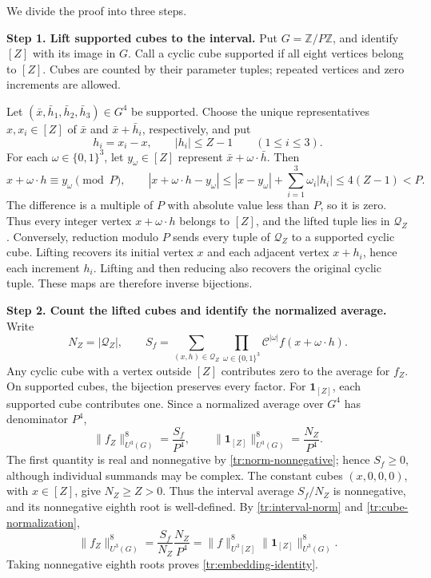 \documentclass[twoside]{aomart}
\makeatletter
\theoremstyle{paperplain}
\theoremstyle{paperdefinition}
\renewenvironment{proof}[1][\proofname]{\par\pushQED{\qed}%
  \normalfont\topsep6\p@\@plus3\p@\relax\trivlist
  \item[\hskip\labelsep\itshape #1\@addpunct{.}]\ignorespaces
}{\popQED\endtrivlist\@endpefalse}
\newcommand{\Z}{\mathbb Z}
\numberwithin{equation}{section}
\makeatother
\begin{document}
\begin{proof}
We divide the proof into three steps.

\medskip
\noindent\textbf{Step 1. Lift supported cubes to the interval.}
Put $G=\Z/P\Z$, and identify $[Z]$ with its image in $G$.
Call a cyclic cube supported if all eight vertices belong to $[Z]$.
Cubes are counted by their parameter tuples; repeated vertices and
zero increments are allowed.

Let $(\bar x,\bar h_1,\bar h_2,\bar h_3)\in G^4$ be supported.
Choose the unique representatives $x,x_i\in[Z]$ of $\bar x$ and
$\bar x+\bar h_i$, respectively, and put
\begin{equation*}
 h_i=x_i-x,\qquad |h_i|\le Z-1 \qquad(1\le i\le3).
\end{equation*}
For each $\omega\in\{0,1\}^3$, let $y_\omega\in[Z]$ represent
$\bar x+\omega\cdot\bar h$. Then
\begin{equation*}
 x+\omega\cdot h\equiv y_\omega\pmod P,\qquad |x+\omega\cdot h-y_\omega|\le |x-y_\omega|+\sum_{i=1}^3\omega_i|h_i|\le4(Z-1)<P.
\end{equation*}
The difference is a multiple of $P$ with absolute value less than
$P$, so it is zero. Thus every integer vertex $x+\omega\cdot h$
belongs to $[Z]$, and the lifted tuple lies in $\mathcal Q_Z$.
Conversely, reduction modulo $P$ sends every tuple of $\mathcal Q_Z$
to a supported cyclic cube. Lifting recovers its initial vertex $x$
and each adjacent vertex $x+h_i$, hence each increment $h_i$.
Lifting and then reducing also recovers the original cyclic tuple.
These maps are therefore inverse bijections.

\medskip
\noindent\textbf{Step 2. Count the lifted cubes and identify the normalized average.}
Write
\begin{equation*}
 N_Z=|\mathcal Q_Z|,\qquad
 S_f=\sum_{(x,h)\in\mathcal Q_Z}
       \prod_{\omega\in\{0,1\}^3}
          \mathcal C^{|\omega|}f(x+\omega\cdot h).
\end{equation*}
Any cyclic cube with a vertex outside $[Z]$ contributes zero to
the average for $f_Z$. On supported cubes, the bijection preserves
every factor. For $\mathbf1_{[Z]}$, each supported cube contributes
one. Since a normalized average over $G^4$ has denominator $P^4$,
\begin{equation}
 \|f_Z\|_{U^3(G)}^8=\frac{S_f}{P^4},\qquad
 \|\mathbf1_{[Z]}\|_{U^3(G)}^8=\frac{N_Z}{P^4}.
 \label{tr:cube-normalization}
\end{equation}
The first quantity is real and nonnegative by
\eqref{tr:norm-nonnegative}; hence $S_f\ge0$, although individual
summands may be complex. The constant cubes $(x,0,0,0)$, with
$x\in[Z]$, give $N_Z\ge Z>0$. Thus the interval average $S_f/N_Z$
is nonnegative, and its nonnegative eighth root is well-defined.
By \eqref{tr:interval-norm} and \eqref{tr:cube-normalization},
\begin{equation*}
 \|f_Z\|_{U^3(G)}^8
 =\frac{S_f}{N_Z}\frac{N_Z}{P^4}
 =\|f\|_{U^3[Z]}^8
    \|\mathbf1_{[Z]}\|_{U^3(G)}^8.
\end{equation*}
Taking nonnegative eighth roots proves \eqref{tr:embedding-identity}.


\end{proof}
\end{document}
